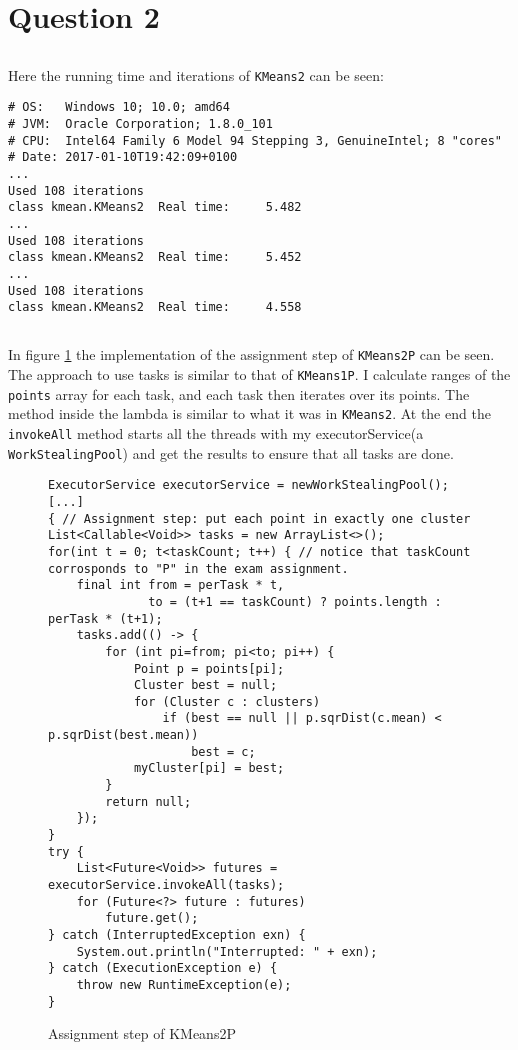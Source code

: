 \section{Question 2}
\subsection{}
Here the running time and iterations of \texttt{KMeans2} can be seen:
\begin{lstlisting}
# OS:   Windows 10; 10.0; amd64
# JVM:  Oracle Corporation; 1.8.0_101
# CPU:  Intel64 Family 6 Model 94 Stepping 3, GenuineIntel; 8 "cores"
# Date: 2017-01-10T19:42:09+0100
...
Used 108 iterations
class kmean.KMeans2  Real time:     5.482
...
Used 108 iterations
class kmean.KMeans2  Real time:     5.452
...
Used 108 iterations
class kmean.KMeans2  Real time:     4.558
\end{lstlisting}

\subsection{}
In figure \ref{code:2:2} the implementation of the assignment step of \texttt{KMeans2P} can be seen. The approach to use tasks is similar to that of \texttt{KMeans1P}. I calculate ranges of the \texttt{points} array for each task, and each task then iterates over its points. The method inside the lambda is similar to what it was in \texttt{KMeans2}. At the end the \texttt{invokeAll} method starts all the threads with my executorService(a \texttt{WorkStealingPool}) and get the results to ensure that all tasks are done.

\begin{figure}
\begin{lstlisting}
ExecutorService executorService = newWorkStealingPool();
[...]
{ // Assignment step: put each point in exactly one cluster
List<Callable<Void>> tasks = new ArrayList<>();
for(int t = 0; t<taskCount; t++) { // notice that taskCount corrosponds to "P" in the exam assignment.
    final int from = perTask * t,
              to = (t+1 == taskCount) ? points.length : perTask * (t+1);
    tasks.add(() -> {
        for (int pi=from; pi<to; pi++) {
            Point p = points[pi];
            Cluster best = null;
            for (Cluster c : clusters)
                if (best == null || p.sqrDist(c.mean) < p.sqrDist(best.mean))
                    best = c;
            myCluster[pi] = best;
        }
        return null;
    });
}
try {
    List<Future<Void>> futures = executorService.invokeAll(tasks);
    for (Future<?> future : futures)
        future.get();
} catch (InterruptedException exn) {
    System.out.println("Interrupted: " + exn);
} catch (ExecutionException e) {
    throw new RuntimeException(e);
}
\end{lstlisting}
\caption{Assignment step of KMeans2P}
\label{code:2:2}
\end{figure}

